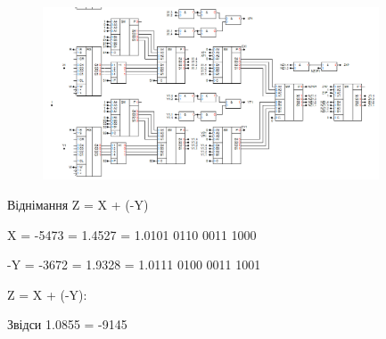 \documentclass[12pt,a4paper]{article}
\begin{document}
    \begin{figure}[ht]
        \centering
        \includegraphics[width=0.89\textwidth]{1_4.png}
    \end{figure}

    \begin{center}
        \large Віднімання Z = X + (-Y)
    \end{center}

    X = -5473 = 1.4527 = 1.0101 0110 0011 1000

    -Y = -3672 = 1.9328 = 1.0111 0100 0011 1001

    Z = X + (-Y):

    \vspace{1em}


    \vspace{1em}

    Звідси 1.0855 = -9145

    \newpage
\end{document}
